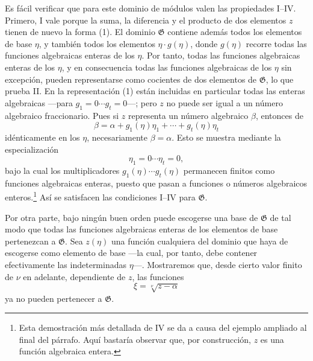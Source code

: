 Es fácil verificar que para este dominio de módulos valen las propiedades I--IV. Primero, I vale porque la suma, la diferencia y el producto de dos elementos $z$ tienen de nuevo la forma (1). El dominio $\mathfrak G$ contiene además todos los elementos de base $\eta$, y también todos los elementos $\eta\cdot g(\eta)$, donde $g(\eta)$ recorre todas las funciones algebraicas enteras de los $\eta$. Por tanto, todas las funciones algebraicas enteras de los $\eta$, y en consecuencia todas las funciones algebraicas de los $\eta$ sin excepción, pueden representarse como cocientes de dos elementos de $\mathfrak G$, lo que prueba II. En la representación (1) están incluidas en particular todas las enteras algebraicas ---para $g_1=0\cdots g_t=0$---; pero $z$ no puede ser igual a un número algebraico fraccionario. Pues si $z$ representa un número algebraico $\beta$, entonces de
\[
 \beta=\alpha+g_1(\eta)\eta_1+\cdots+g_t(\eta)\eta_t
\]
idénticamente en los $\eta$, necesariamente $\beta=\alpha$. Esto se muestra mediante la especialización
\[
 \eta_1=0\cdots \eta_t=0,
\]
bajo la cual los multiplicadores $g_1(\eta)\cdots g_t(\eta)$ permanecen finitos como funciones algebraicas enteras, puesto que pasan a funciones o números algebraicos enteros.\footnote{Esta demostración más detallada de IV se da a causa del ejemplo ampliado al final del párrafo. Aquí bastaría observar que, por construcción, $z$ es una función algebraica entera.} Así se satisfacen las condiciones I--IV para $\mathfrak G$.

Por otra parte, bajo ningún buen orden puede escogerse una base de $\mathfrak G$ de tal modo que todas las funciones algebraicas enteras de los elementos de base pertenezcan a $\mathfrak G$. Sea $z(\eta)$ una función cualquiera del dominio que haya de escogerse como elemento de base ---la cual, por tanto, debe contener efectivamente las indeterminadas $\eta$---. Mostraremos que, desde cierto valor finito de $\nu$ en adelante, dependiente de $z$, las funciones
\[
 \xi=\sqrt[\nu]{z-\alpha}
\]
ya no pueden pertenecer a $\mathfrak G$.

